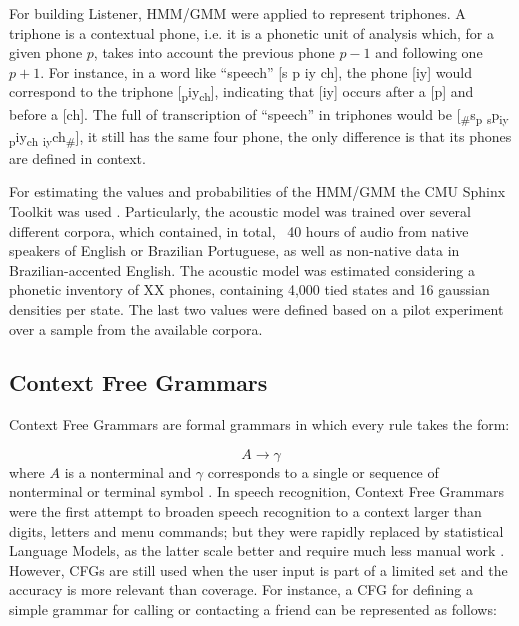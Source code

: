 \documentclass[twocolumn]{bmcart}%
\begin{document}
For building Listener, HMM/GMM were applied to represent triphones. A triphone is a contextual phone, i.e. it is a phonetic unit of analysis which, for a given phone $p$, takes into account the previous phone $p-1$ and following one $p+1$. For instance, in a word like ``speech'' [s p iy ch], the phone [iy] would correspond to the triphone [\textsubscript{p}iy\textsubscript{ch}], indicating that [iy] occurs after a [p] and before a [ch]. The full of transcription of ``speech'' in triphones would be [\textsubscript{\#}s\textsubscript{p} \textsubscript{s}p\textsubscript{iy} \textsubscript{p}iy\textsubscript{ch} \textsubscript{iy}ch\textsubscript{\#}], it still has the same four phone, the only difference is that its phones are defined in context.

For estimating the values and probabilities of the HMM/GMM the CMU Sphinx Toolkit was used \cite{CMU2016}. 
Particularly, the acoustic model was trained over several different corpora, which contained, in total, ~40 hours of audio from native speakers of English or Brazilian Portuguese, as well as non-native data in Brazilian-accented English. The acoustic model was estimated considering a phonetic inventory of XX phones, containing 4,000 tied states and 16 gaussian densities per state. The last two values were defined based on a pilot experiment over a sample from the available corpora.


\subsection*{\textbf{Context Free Grammars}}

Context Free Grammars are formal grammars in which every rule takes the form:

\begin{equation}
A \rightarrow \gamma
\end{equation}
where $A$ is a nonterminal and $\gamma$ corresponds to a single or sequence of nonterminal or terminal symbol \cite{Jurafsky2000}. In speech recognition, Context Free Grammars were the first attempt to broaden speech recognition to a context larger than digits, letters and menu commands; but they were rapidly replaced by statistical Language Models, as the latter scale better and require much less manual work \cite{Gales2008}. However, CFGs are still used when the user input is part of a limited set and the accuracy is more relevant than coverage. For instance, a CFG for defining a simple grammar for calling or contacting a friend can be represented as follows:
\end{document}

